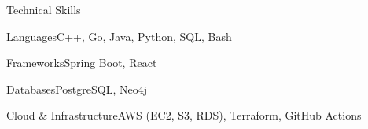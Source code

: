 \documentclass[
	11pt
]{../../../template}
\begin{document}
	\begin{rSection}{T}{echnical Skills}
		\begin{rSet}{Languages}{C++, Go, Java, Python, SQL, Bash}
		\end{rSet}
		\begin{rSet}{Frameworks}{Spring Boot, React}
		\end{rSet}
		\begin{rSet}{Databases}{PostgreSQL, Neo4j}
		\end{rSet}
		\begin{rSet}{Cloud \& Infrastructure}{AWS (EC2, S3, RDS), Terraform, GitHub Actions}
		\end{rSet}
	\end{rSection}
\end{document}
